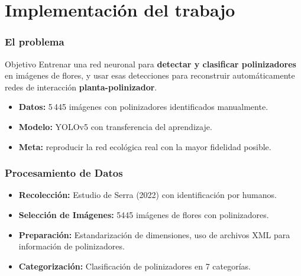 \section{Implementación del trabajo}

\begin{frame}
    \frametitle{El problema}

    \begin{block}{Objetivo}
        Entrenar una red neuronal para \textbf{detectar y clasificar polinizadores}
        en imágenes de flores, y usar esas detecciones para reconstruir
        automáticamente redes de interacción \textbf{planta-polinizador}.
    \end{block}

    \pause
    \begin{itemize}
        \item \textbf{Datos:} 5\,445 imágenes con polinizadores identificados manualmente.
        \item \textbf{Modelo:} YOLOv5 con transferencia del aprendizaje.
        \item \textbf{Meta:} reproducir la red ecológica real con la mayor fidelidad posible.
    \end{itemize}

\end{frame}

\begin{frame}
    \frametitle{Procesamiento de Datos}
    \begin{itemize}
        \item \textbf{Recolección:} Estudio de Serra (2022) con identificación por humanos.
        \item \textbf{Selección de Imágenes:} 5445 imágenes de flores con polinizadores.
        \item \textbf{Preparación:} Estandarización de dimensiones, uso de archivos XML para información de polinizadores.
        \item \textbf{Categorización:} Clasificación de polinizadores en 7 categorías.
    \end{itemize}
\end{frame}

